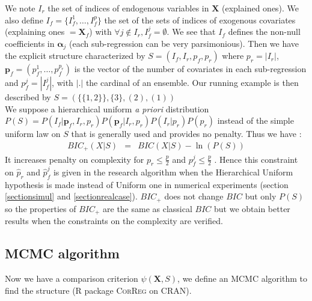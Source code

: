 \documentclass[11pt,a4paper]{article}
\begin{document}
	We note $I_r$ the set of indices of endogenous variables in $\boldsymbol{X}$ (explained ones).
We also define $I_f=\{I_f^1,\dots,I_f^p \}$ the set of the sets of indices of exogenous covariates (explaining ones $=\boldsymbol{X}_f$) with $\forall j \notin I_r, I_f^j=\emptyset$. 
We see that $I_f$ defines the non-null coefficients in $\boldsymbol{\alpha}_j$ (each sub-regression can be very parsimonious).
Then we have the explicit structure characterized by $S=(I_f,I_r,p_f,p_r)$ where $p_r=|I_r|$, $\boldsymbol{p}_f=(p_f^1,\dots,p_f^{p_r})$ is the vector of the number of covariates in each sub-regression  and $p_f^j=|I_f^j|$, with $|.|$ the cardinal of an ensemble. Our running example is then described by $S= \left( \{ \{1,2\}\},\{3\},(2),(1)\right)$
\\
	 We suppose a hierarchical uniform {\it a priori} distribution $P(S)=P(I_f | \boldsymbol{p}_f,I_r,p_r)P(\boldsymbol{p}_f|I_r,p_r)P(I_r|p_r)P(p_r)$  instead of the simple uniform law on $S$ that is generally used and provides no penalty.
	 Thus we have :
		\begin{eqnarray}
		BIC_+(X|S)&=&BIC(X|S) -\ln(P(S)) \label{Bicstar}
	\end{eqnarray}		
	It increases penalty on complexity for $p_r\leq\frac{p}{2}$ and $p_f^j\leq\frac{p}{2}$ . Hence %
	this constraint on $\hat{p}_r$ and $\hat{p}_f^j$ is given in the research algorithm when the Hierarchical Uniform hypothesis is made instead of Uniform one in numerical experiments (section \ref{sectionsimul} and \ref{sectionrealcase}).
		$BIC_+$ does not change $BIC$ but only $P(S)$ so the properties of $BIC_+$ are the same as classical $BIC$ but we obtain better results when the constraints on the complexity are verified.  %

%	


\subsection{MCMC algorithm}
	Now we have a comparison criterion $\psi(\boldsymbol{X},S)$, we define an MCMC algorithm to find the structure (R package \textsc{CorReg} on CRAN). 
\end{document}
